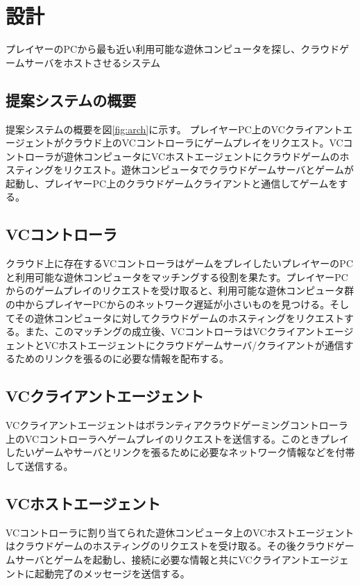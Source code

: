 \section{設計}

プレイヤーのPCから最も近い利用可能な遊休コンピュータを探し、クラウドゲームサーバをホストさせるシステム

\subsection{提案システムの概要}
提案システムの概要を図\ref{fig:arch}に示す。
プレイヤーPC上のVCクライアントエージェントがクラウド上のVCコントローラにゲームプレイをリクエスト。VCコントローラが遊休コンピュータにVCホストエージェントにクラウドゲームのホスティングをリクエスト。遊休コンピュータでクラウドゲームサーバとゲームが起動し、プレイヤーPC上のクラウドゲームクライアントと通信してゲームをする。

\subsection{VCコントローラ}
クラウド上に存在するVCコントローラはゲームをプレイしたいプレイヤーのPCと利用可能な遊休コンピュータをマッチングする役割を果たす。プレイヤーPCからのゲームプレイのリクエストを受け取ると、利用可能な遊休コンピュータ群の中からプレイヤーPCからのネットワーク遅延が小さいものを見つける。そしてその遊休コンピュータに対してクラウドゲームのホスティングをリクエストする。また、このマッチングの成立後、VCコントローラはVCクライアントエージェントとVCホストエージェントにクラウドゲームサーバ/クライアントが通信するためのリンクを張るのに必要な情報を配布する。

\subsection{VCクライアントエージェント}
VCクライアントエージェントはボランティアクラウドゲーミングコントローラ上のVCコントローラへゲームプレイのリクエストを送信する。このときプレイしたいゲームやサーバとリンクを張るために必要なネットワーク情報などを付帯して送信する。

\subsection{VCホストエージェント}
VCコントローラに割り当てられた遊休コンピュータ上のVCホストエージェントはクラウドゲームのホスティングのリクエストを受け取る。その後クラウドゲームサーバとゲームを起動し、接続に必要な情報と共にVCクライアントエージェントに起動完了のメッセージを送信する。


